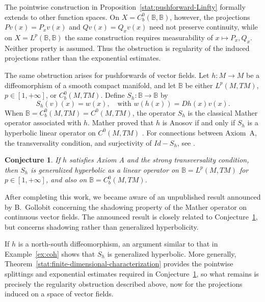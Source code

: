 \documentclass[12pt]{article}
\newcommand{\Bb}{\mathbb{B}}
\newtheorem{conj}[thm]{Conjecture}
\theoremstyle{definition}
\newtheorem{remark}[thm]{Remark}
\begin{document}
The pointwise construction in Proposition~\ref{stat:pushforward-Linfty} formally extends to other function spaces. 
On $X=C_b^0(\Bb,\Bb)$, however, the projections $Pv(x)=P_xv(x)$ and $Qv(x)=Q_xv(x)$ need not preserve continuity, while on $X=L^p(\Bb,\Bb)$ the same construction requires measurability of $x\mapsto P_x,Q_x$. Neither property is assumed. 
Thus the obstruction is regularity of the induced projections rather than the exponential estimates.

The same obstruction arises for pushforwards of vector fields. Let
$h:M\to M$ be a diffeomorphism of a smooth compact manifold, and let
$\Bb$ be either $L^p(M,TM)$, $p\in[1,+\infty]$, or $C_b^0(M,TM)$.
Define $S_h:\Bb\to\Bb$ by
\begin{equation}\label{eq:3-3-S}
S_h(v)(x) = w(x), \quad \mbox{with $w(h(x)) = Dh(x)v(x)$}.
\end{equation}
When $\Bb=C_b^0(M,TM)=C^0(M,TM)$, the operator $S_h$ is the classical Mather operator associated with $h$. Mather proved that $h$ is Anosov if and only if $S_h$ is a hyperbolic linear operator on $C^0(M,TM)$ \cite{Mather1968}. For connections between Axiom~A, the transversality condition, and surjectivity of $Id-S_h$, see \cite{Rob71,Mane1975,Mane1977,An2009}.
\begin{conj}\label{conj:AA}
   If $h$ satisfies Axiom A and the strong transversality condition, then $S_h$ is generalized hyperbolic as a linear operator on $\Bb = L^p(M, TM)$ for $p \in [1, + \infty]$, and also on $\Bb = C^0_b(M, TM)$.
\end{conj}
After completing this work, we became aware of an unpublished result announced by B.~Gollobit concerning the shadowing property of the Mather operator on continuous vector fields. The announced result is closely related to Conjecture~\ref{conj:AA}, but concerns shadowing rather than generalized hyperbolicity.

If $h$ is a north-south diffeomorphism, an argument similar to that in Example~\ref{ex:coh} shows that $S_h$ is generalized hyperbolic. More generally, Theorem~\ref{stat:finite-dimensional-characterization} provides the pointwise splittings and exponential estimates required in Conjecture~\ref{conj:AA}, so what remains is precisely the regularity obstruction described above, now for the projections induced on a space of vector fields.
\end{document}
